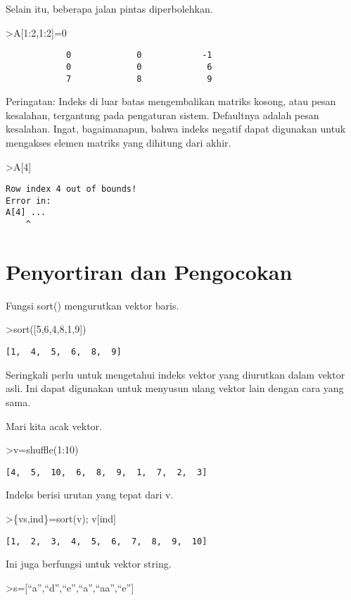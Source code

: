\documentclass[
]{book}
\begin{document}
Selain itu, beberapa jalan pintas diperbolehkan.

\textgreater A{[}1:2,1:2{]}=0

\begin{verbatim}
            0             0            -1 
            0             0             6 
            7             8             9 
\end{verbatim}

Peringatan: Indeks di luar batas mengembalikan matriks kosong, atau pesan kesalahan, tergantung pada pengaturan sistem. Defaultnya adalah pesan kesalahan. Ingat, bagaimanapun, bahwa indeks negatif dapat digunakan untuk mengakses elemen matriks yang dihitung dari akhir.

\textgreater A{[}4{]}

\begin{verbatim}
Row index 4 out of bounds!
Error in:
A[4] ...
    ^
\end{verbatim}

\chapter{Penyortiran dan Pengocokan}\label{penyortiran-dan-pengocokan}

Fungsi sort() mengurutkan vektor baris.

\textgreater sort({[}5,6,4,8,1,9{]})

\begin{verbatim}
[1,  4,  5,  6,  8,  9]
\end{verbatim}

Seringkali perlu untuk mengetahui indeks vektor yang diurutkan dalam vektor asli. Ini dapat digunakan untuk menyusun ulang vektor lain dengan cara yang sama.

Mari kita acak vektor.

\textgreater v=shuffle(1:10)

\begin{verbatim}
[4,  5,  10,  6,  8,  9,  1,  7,  2,  3]
\end{verbatim}

Indeks berisi urutan yang tepat dari v.

\textgreater\{vs,ind\}=sort(v); v{[}ind{]}

\begin{verbatim}
[1,  2,  3,  4,  5,  6,  7,  8,  9,  10]
\end{verbatim}

Ini juga berfungsi untuk vektor string.

\textgreater s={[}``a'',``d'',``e'',``a'',``aa'',``e''{]}
\end{document}
